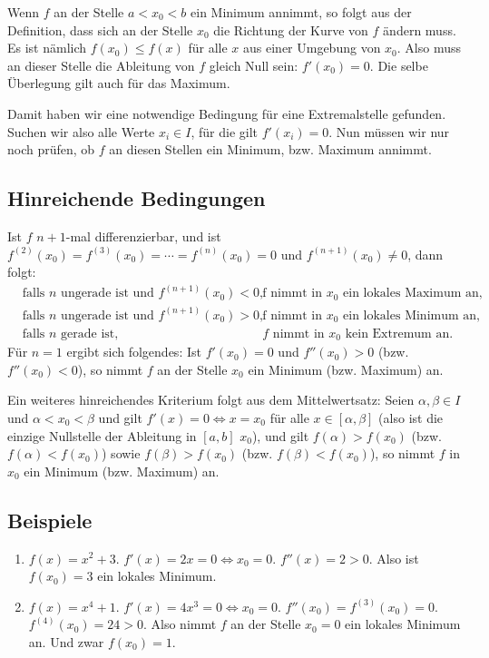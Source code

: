 Wenn $f$ an der Stelle $a < x_0 < b$ ein Minimum annimmt, so folgt aus der Definition, dass sich an der Stelle $x_0$ die Richtung
der Kurve von $f$ ändern muss. Es ist nämlich $f(x_0) \leq f(x)$ für alle $x$ aus einer Umgebung von $x_0$. Also muss an dieser
Stelle die Ableitung von $f$ gleich Null sein: $f'(x_0) = 0$. Die selbe Überlegung gilt auch für das Maximum.

Damit haben wir eine notwendige Bedingung für eine Extremalstelle gefunden. Suchen wir also alle Werte $x_i\in I$, für die gilt
$f'(x_i) = 0$. Nun müssen wir nur noch prüfen, ob $f$ an diesen Stellen ein Minimum, bzw. Maximum annimmt.

\subsection{Hinreichende Bedingungen}

Ist $f$ $n+1$-mal differenzierbar, und ist $f^{(2)}(x_0) = f^{(3)}(x_0) = \cdots = f^{(n)}(x_0) = 0$ und $f^{(n+1)}(x_0) \neq 0$,
dann folgt:
\begin{align*}
    & \text{falls $n$ ungerade ist und $f^{(n+1)}(x_0) < 0$,} & \text{f nimmt in $x_0$ ein lokales Maximum an,} \\
    & \text{falls $n$ ungerade ist und $f^{(n+1)}(x_0) > 0$,} & \text{f nimmt in $x_0$ ein lokales Minimum an,} \\
    & \text{falls $n$ gerade ist,} & \text{$f$ nimmt in $x_0$ kein Extremum an.}
\end{align*}
Für $n=1$ ergibt sich folgendes: Ist $f'(x_0) = 0$ und $f''(x_0) > 0$ (bzw. $f''(x_0) < 0$), so nimmt $f$ an der Stelle $x_0$
ein Minimum (bzw. Maximum) an.

Ein weiteres hinreichendes Kriterium folgt aus dem Mittelwertsatz: Seien $\alpha,\beta \in I$ und $\alpha < x_0 < \beta$ und gilt
$f'(x) = 0 \Leftrightarrow x = x_0$ für alle $x\in [\alpha,\beta]$ (also ist die einzige Nullstelle der Ableitung in $[a,b]$ $x_0$),
und gilt $f(\alpha) > f(x_0)$ (bzw. $f(\alpha) < f(x_0)$) sowie $f(\beta) > f(x_0)$ (bzw. $f(\beta) < f(x_0)$), so nimmt $f$ in
$x_0$ ein Minimum (bzw. Maximum) an.

\subsection{Beispiele}

\begin{enumerate}
    \item $f(x) = x^2 + 3$. $f'(x) = 2x = 0 \Leftrightarrow x_0 = 0$. $f''(x) = 2 > 0$. Also ist $f(x_0) = 3$ ein lokales Minimum.
    \item $f(x) = x^4 + 1$. $f'(x) = 4x^3 = 0 \Leftrightarrow x_0 = 0$. $f''(x_0) = f^{(3)}(x_0) = 0$. $f^{(4)}(x_0) = 24 > 0$. Also
        nimmt $f$ an der Stelle $x_0 = 0$ ein lokales Minimum an. Und zwar $f(x_0) = 1$.
\end{enumerate}

